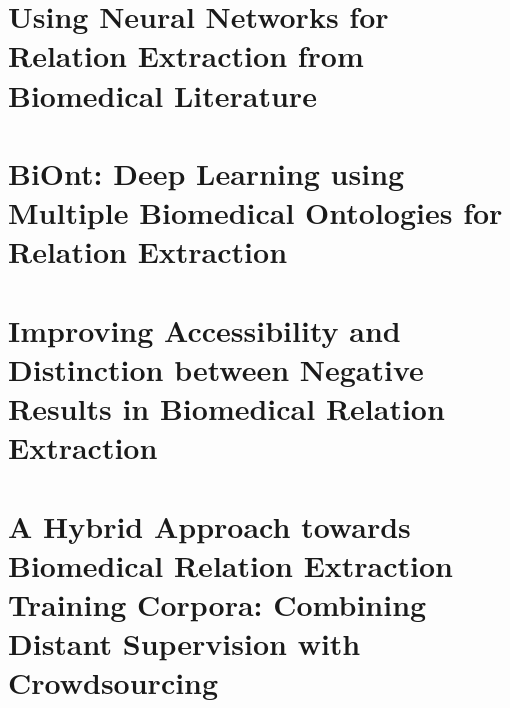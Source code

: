 

\hypertarget{a}{\appendix}
\hypertarget{AA}{\chapter{Using Neural Networks for Relation Extraction from Biomedical Literature}}


\hypertarget{AB}{\chapter{BiOnt: Deep Learning using Multiple Biomedical Ontologies for Relation Extraction}}


\hypertarget{AC}{\chapter{Improving Accessibility and Distinction between Negative Results in Biomedical Relation Extraction}}


\hypertarget{AD}{\chapter{A Hybrid Approach towards Biomedical Relation Extraction Training Corpora: Combining Distant Supervision with Crowdsourcing}}


